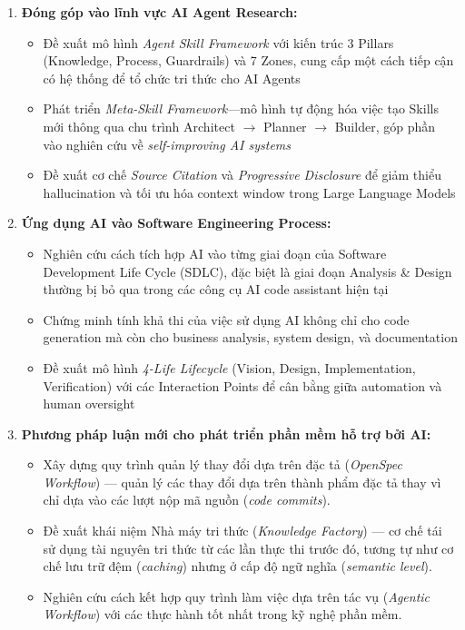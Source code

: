 \documentclass[13pt,a4paper,oneside]{extreport}
\numberwithin{equation}{chapter}
\numberwithin{figure}{chapter}
\numberwithin{table}{chapter}
\begin{document}
\begin{enumerate}
    \item \textbf{Đóng góp vào lĩnh vực AI Agent Research:}
    \begin{itemize}
        \item Đề xuất mô hình \textit{Agent Skill Framework} với kiến trúc 3 Pillars (Knowledge, Process, Guardrails) và 7 Zones, cung cấp một cách tiếp cận có hệ thống để tổ chức tri thức cho AI Agents
        \item Phát triển \textit{Meta-Skill Framework}---mô hình tự động hóa việc tạo Skills mới thông qua chu trình Architect $\rightarrow$ Planner $\rightarrow$ Builder, góp phần vào nghiên cứu về \textit{self-improving AI systems}
        \item Đề xuất cơ chế \textit{Source Citation} và \textit{Progressive Disclosure} để giảm thiểu hallucination và tối ưu hóa context window trong Large Language Models
    \end{itemize}

    \item \textbf{Ứng dụng AI vào Software Engineering Process:}
    \begin{itemize}
        \item Nghiên cứu cách tích hợp AI vào từng giai đoạn của Software Development Life Cycle (SDLC), đặc biệt là giai đoạn Analysis \& Design thường bị bỏ qua trong các công cụ AI code assistant hiện tại
        \item Chứng minh tính khả thi của việc sử dụng AI không chỉ cho code generation mà còn cho business analysis, system design, và documentation
        \item Đề xuất mô hình \textit{4-Life Lifecycle} (Vision, Design, Implementation, Verification) với các Interaction Points để cân bằng giữa automation và human oversight
    \end{itemize}

    \item \textbf{Phương pháp luận mới cho phát triển phần mềm hỗ trợ bởi AI:}
    \begin{itemize}
        \item Xây dựng quy trình quản lý thay đổi dựa trên đặc tả (\textit{OpenSpec Workflow}) — quản lý các thay đổi dựa trên thành phẩm đặc tả thay vì chỉ dựa vào các lượt nộp mã nguồn (\textit{code commits}).
        \item Đề xuất khái niệm Nhà máy tri thức (\textit{Knowledge Factory}) — cơ chế tái sử dụng tài nguyên tri thức từ các lần thực thi trước đó, tương tự như cơ chế lưu trữ đệm (\textit{caching}) nhưng ở cấp độ ngữ nghĩa (\textit{semantic level}).
        \item Nghiên cứu cách kết hợp quy trình làm việc dựa trên tác vụ (\textit{Agentic Workflow}) với các thực hành tốt nhất trong kỹ nghệ phần mềm.
    \end{itemize}
\end{enumerate}
\end{document}
